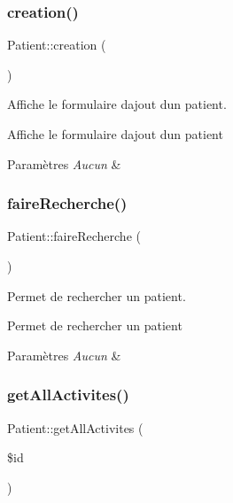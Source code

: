 \subsubsection{\texorpdfstring{creation()}{creation()}}
{\footnotesize\ttfamily Patient\+::creation (\begin{DoxyParamCaption}{ }\end{DoxyParamCaption})}



Affiche le formulaire d\textquotesingle{}ajout d\textquotesingle{}un patient. 

Affiche le formulaire d\textquotesingle{}ajout d\textquotesingle{}un patient 
\begin{DoxyParams}{Paramètres}
{\em Aucun} & \\
\hline
\end{DoxyParams}
\mbox{\label{class_patient_ac6376a017eb21e63247f4a98b5a98ab2}} 
\subsubsection{\texorpdfstring{faire\+Recherche()}{faireRecherche()}}
{\footnotesize\ttfamily Patient\+::faire\+Recherche (\begin{DoxyParamCaption}{ }\end{DoxyParamCaption})}



Permet de rechercher un patient. 

Permet de rechercher un patient 
\begin{DoxyParams}{Paramètres}
{\em Aucun} & \\
\hline
\end{DoxyParams}
\mbox{\label{class_patient_a16ba27b24b5f47f4777a2347637d589b}} 
\subsubsection{\texorpdfstring{get\+All\+Activites()}{getAllActivites()}}
{\footnotesize\ttfamily Patient\+::get\+All\+Activites (\begin{DoxyParamCaption}\item[{}]{\$id }\end{DoxyParamCaption})}



